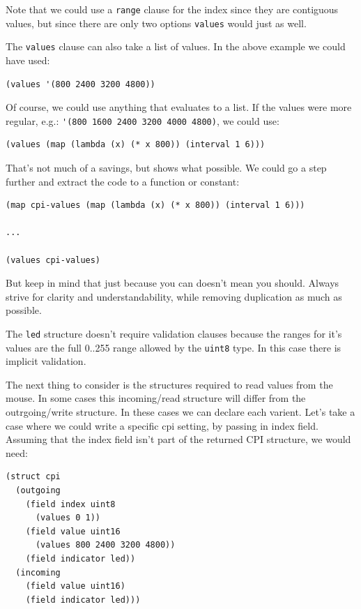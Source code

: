 \documentclass[12pt]{article}
\begin{document}
Note that we could use a \verb|range| clause for the index since they
are contiguous values, but since there are only two options
\verb|values| would just as well.

The \verb|values| clause can also take a list of values. In the above
example we could have used:

\begin{verbatim}
(values '(800 2400 3200 4800))  
\end{verbatim}

Of course, we could use anything that evaluates to a list. If the
values were more regular, e.g.:
\verb|'(800 1600 2400 3200 4000 4800)|, we could use:

\begin{verbatim}
(values (map (lambda (x) (* x 800)) (interval 1 6)))
\end{verbatim}

That's not much of a savings, but shows what possible. We could go a
step further and extract the code to a function or constant:

\begin{verbatim}
(map cpi-values (map (lambda (x) (* x 800)) (interval 1 6)))

...

(values cpi-values)
\end{verbatim}

But keep in mind that just because you can doesn't mean you should.
Always strive for clarity and understandability, while removing
duplication as much as possible.

The \verb|led| structure doesn't require validation clauses because
the ranges for it's values are the full 0..255 range allowed by the
\verb|uint8| type. In this case there is implicit validation.

The next thing to consider is the structures required to read values
from the mouse. In some cases this incoming/read structure will differ
from the outrgoing/write structure. In these cases we can declare each
varient. Let's take a case where we could write a specific cpi
setting, by passing in index field. Assuming that the index field
isn't part of the returned CPI structure, we would need:

\begin{verbatim}
(struct cpi
  (outgoing
    (field index uint8
      (values 0 1))
    (field value uint16
      (values 800 2400 3200 4800))
    (field indicator led))
  (incoming
    (field value uint16)
    (field indicator led)))
\end{verbatim}
\end{document}
